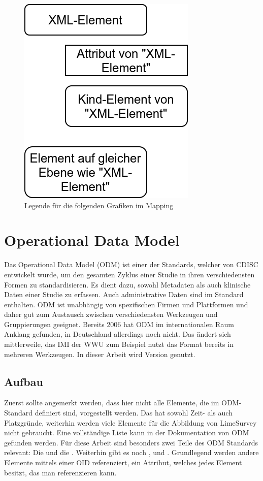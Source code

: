 \begin{figure}[h]
			\centering
			\includegraphics[width=.30\textwidth]{./img/legend.png}
			\caption{Legende für die folgenden Grafiken im Mapping}
			\label{fig:legend}
\end{figure}

\section{Operational Data Model}
\label{m:odm}

Das Operational Data Model (ODM) ist einer der Standards, welcher von CDISC entwickelt wurde, um den gesamten Zyklus einer Studie in ihren verschiedensten Formen zu standardisieren.
Es dient dazu, sowohl Metadaten als auch klinische Daten einer Studie zu erfassen. Auch administrative Daten sind im Standard enthalten.
ODM ist unabhängig von spezifischen Firmen und Plattformen und daher gut zum Austausch zwischen verschiedensten Werkzeugen und Gruppierungen geeignet.
Bereits 2006 hat ODM im internationalen Raum Anklang gefunden, in Deutschland allerdings noch nicht\cite{odm_art}.
Das ändert sich mittlerweile, das IMI der WWU zum Beispiel nutzt das Format bereits in mehreren Werkzeugen.
In dieser Arbeit wird Version  genutzt.

\subsection{Aufbau}

Zuerst sollte angemerkt werden, dass hier nicht alle Elemente, die im ODM-Standard definiert sind, vorgestellt werden. Das hat sowohl Zeit- als auch Platzgründe, weiterhin werden viele Elemente für die Abbildung von LimeSurvey nicht gebraucht.
Eine vollständige Liste kann in der Dokumentation von ODM gefunden werden\cite{odm}.
Für diese Arbeit sind besonders zwei Teile des ODM Standards relevant: Die  und die .
Weiterhin gibt es noch ,  und .
Grundlegend werden andere Elemente mittels einer OID referenziert, ein Attribut, welches jedes Element besitzt, das man referenzieren kann.

